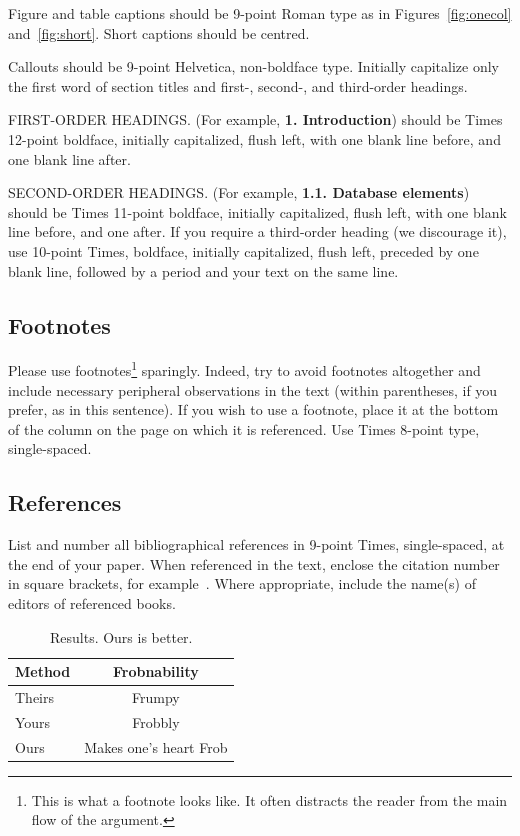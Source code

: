 \documentclass[10pt,twocolumn,letterpaper]{article}
\begin{document}
Figure and table captions should be 9-point Roman type as in
Figures~\ref{fig:onecol} and~\ref{fig:short}.  Short captions should be centred.

\noindent Callouts should be 9-point Helvetica, non-boldface type.
Initially capitalize only the first word of section titles and first-,
second-, and third-order headings.

FIRST-ORDER HEADINGS. (For example, {\large \bf 1. Introduction})
should be Times 12-point boldface, initially capitalized, flush left,
with one blank line before, and one blank line after.

SECOND-ORDER HEADINGS. (For example, { \bf 1.1. Database elements})
should be Times 11-point boldface, initially capitalized, flush left,
with one blank line before, and one after. If you require a third-order
heading (we discourage it), use 10-point Times, boldface, initially
capitalized, flush left, preceded by one blank line, followed by a period
and your text on the same line.

\subsection{Footnotes}

Please use footnotes\footnote {This is what a footnote looks like.  It
often distracts the reader from the main flow of the argument.} sparingly.
Indeed, try to avoid footnotes altogether and include necessary peripheral
observations in
the text (within parentheses, if you prefer, as in this sentence).  If you
wish to use a footnote, place it at the bottom of the column on the page on
which it is referenced. Use Times 8-point type, single-spaced.


\subsection{References}

List and number all bibliographical references in 9-point Times,
single-spaced, at the end of your paper. When referenced in the text,
enclose the citation number in square brackets, for
example~\cite{Authors14}.  Where appropriate, include the name(s) of
editors of referenced books.

\begin{table}
\begin{center}
\begin{tabular}{|l|c|}
\hline
Method & Frobnability \\
\hline\hline
Theirs & Frumpy \\
Yours & Frobbly \\
Ours & Makes one's heart Frob\\
\hline
\end{tabular}
\end{center}
\caption{Results.   Ours is better.}
\end{table}
\end{document}
